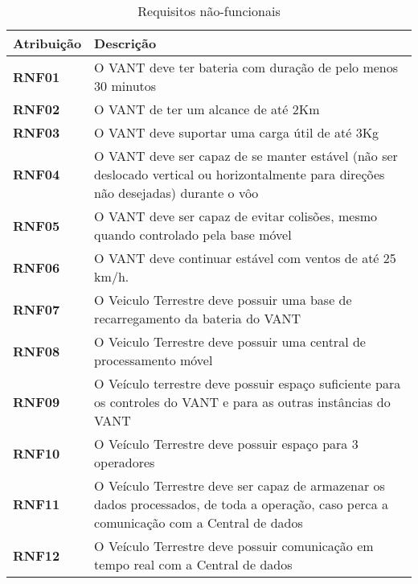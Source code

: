 \newpage
\begin{table}[H]
\centering
\begin{tabular}{ | p{3cm} | p{9cm}| }
 \hline
\textbf{Atribuição} & \textbf{Descrição} \\ \hline
\textbf{RNF01} & O VANT deve ter bateria com duração de pelo menos 30 minutos \\ \hline
\textbf{RNF02} & O VANT de ter um alcance de até 2Km \\ \hline
\textbf{RNF03} & O VANT deve suportar uma carga útil de até 3Kg \\ \hline
\textbf{RNF04} & O VANT deve ser capaz de se manter estável (não ser deslocado vertical ou horizontalmente para direções não desejadas) durante o vôo \\ \hline
\textbf{RNF05} & O VANT deve ser capaz de evitar colisões, mesmo quando controlado pela base móvel \\ \hline
\textbf{RNF06} & O VANT deve continuar estável com ventos de até 25 km/h.\\ \hline
\textbf{RNF07} & O Veiculo Terrestre deve possuir uma base de recarregamento da bateria do VANT \\ \hline
\textbf{RNF08} & O Veiculo Terrestre deve possuir uma central de processamento móvel \\ \hline
\textbf{RNF09} & O Veículo terrestre deve possuir espaço suficiente para os controles do VANT e para as outras instâncias do VANT \\ \hline
\textbf{RNF10} & O Veículo Terrestre deve possuir espaço para 3 operadores \\ \hline
\textbf{RNF11} & O Veículo Terrestre deve ser capaz de armazenar os dados processados, de toda a operação, caso perca a comunicação com a Central de dados \\ \hline
\textbf{RNF12} & O Veículo Terrestre deve possuir comunicação em tempo real com a Central de dados \\ \hline
\end{tabular}
\caption{Requisitos não-funcionais}
\end{table}

\relax
